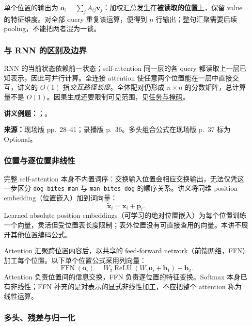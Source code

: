 单个位置的输出为 $\mathbf o_i=\sum_j A_{ij}\mathbf v_j$：加权汇总发生在\textbf{被读取的位置}上，保留 value 的特征维度。对全部 query 重复该运算，便得到 $n$ 行输出；整句汇聚需要后续 pooling，不能把两者混为一谈。

\subsubsection{与 RNN 的区别及边界}

RNN 的当前状态依赖前一状态；self-attention 同一层的各 query 都读取上一层已知表示，因此可并行计算。全连接 attention 使任意两个位置能在一层中直接交互，讲义的 $O(1)$ 指\emph{交互路径长度}。全体配对仍形成 $n\times n$ 的分数矩阵，总计算量不是 $O(1)$。因果生成还要限制可见范围，见\hyperref[topic:SC4002-L11-T04]{任务与掩码}。

\textbf{讲义例题：}；。

\nopagebreak[4]
\textbf{来源：}现场版 pp.~28--41；录播版 p.~36。多头组合公式在现场版 p.~37 标为 Optional。

\subsubsection{位置与逐位置非线性}

完整 self-attention 本身不内置词序：交换输入位置会相应交换输出，无法仅凭这一步区分 \texttt{dog bites man} 与 \texttt{man bites dog} 的顺序关系。讲义将同维 position embedding（位置嵌入）加到词向量：
\[
 \widetilde{\mathbf x}_i=\mathbf x_i+\mathbf p_i.
\]
Learned absolute position embeddings（可学习的绝对位置嵌入）为每个位置训练一个向量，灵活但受位置表长度限制；表外位置没有可直接查用的向量。本讲不展开其他位置编码公式。

Attention 汇聚跨位置内容后，以共享的 feed-forward network（前馈网络，FFN）加工每个位置。以下单个位置公式采用列向量：
\[
 \operatorname{FFN}(\mathbf o_i)
 =W_2\operatorname{ReLU}(W_1\mathbf o_i+\mathbf b_1)+\mathbf b_2.
\]
Attention 负责位置间的信息交换，FFN 负责逐位置的特征变换。Softmax 本身已有非线性；FFN 补充的是对表示的显式非线性加工，不应把整个 attention 称为线性运算。

\subsubsection{多头、残差与归一化}

